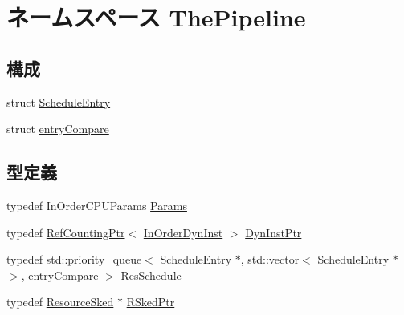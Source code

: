 \hypertarget{namespaceThePipeline}{
\section{ネームスペース ThePipeline}
\label{namespaceThePipeline}
}
\subsection*{構成}
\begin{DoxyCompactItemize}
\item 
struct \hyperlink{structThePipeline_1_1ScheduleEntry}{ScheduleEntry}
\item 
struct \hyperlink{structThePipeline_1_1entryCompare}{entryCompare}
\end{DoxyCompactItemize}
\subsection*{型定義}
\begin{DoxyCompactItemize}
\item 
typedef InOrderCPUParams \hyperlink{namespaceThePipeline_ab62ca16eeca26566ad2422b5df4943ce}{Params}
\item 
typedef \hyperlink{classRefCountingPtr}{RefCountingPtr}$<$ \hyperlink{classInOrderDynInst}{InOrderDynInst} $>$ \hyperlink{namespaceThePipeline_a992959fefcd659c6ba422aa4de14677c}{DynInstPtr}
\item 
typedef std::priority\_\-queue$<$ \hyperlink{structThePipeline_1_1ScheduleEntry}{ScheduleEntry} $\ast$, \hyperlink{classstd_1_1vector}{std::vector}$<$ \hyperlink{structThePipeline_1_1ScheduleEntry}{ScheduleEntry} $\ast$ $>$, \hyperlink{structThePipeline_1_1entryCompare}{entryCompare} $>$ \hyperlink{namespaceThePipeline_a5b095dc783c5dc7d8c0c1fd4c7c2404c}{ResSchedule}
\item 
typedef \hyperlink{classResourceSked}{ResourceSked} $\ast$ \hyperlink{namespaceThePipeline_a3c31767e98b29d5b17248f4c92fec587}{RSkedPtr}
\end{DoxyCompactItemize}
